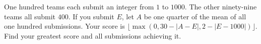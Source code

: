 One hundred teams each submit an integer from $1$ to $1000$. The other ninety-nine teams all submit $400$. If you submit $E$, let $A$ be one quarter of the mean of all one hundred submissions. Your score is $\lfloor\max(0,30-|A-E|,2-|E-1000|)\rfloor$. Find your greatest score and all submissions achieving it.
